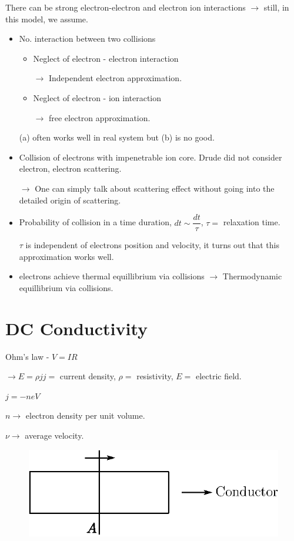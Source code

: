 There can be strong electron-electron and electron ion interactions $\to$ still, in this model, we assume.
\begin{itemize}
\item[(i)] No. interaction between two collisions
\begin{itemize}
\item[(a)] Neglect of electron - electron interaction

$\to$ Independent electron approximation.

\item[(b)] Neglect of electron - ion interaction

$\to$ free electron approximation.
\end{itemize}
(a) often works well in real system but (b) is no good.

\item[(ii)] Collision of electrons with impenetrable ion core. Drude did not consider electron, electron scattering.

$\to$ One can simply talk about scattering effect without going into the detailed origin of scattering.

\item[(iii)] Probability of collision in a time duration, $dt\sim \dfrac{dt}{\tau}$, $\tau=$ relaxation time.

$\tau$ is independent of electrons position and velocity, it turns out that this approximation works well.

\item[(iv)] electrons achieve thermal equillibrium via collisions $\to$ Thermodynamic equillibrium via collisions.
\end{itemize}

\section*{DC Conductivity}

Ohm's law - $V=IR$

$\to E=\rho j$\quad $j=$ current density, $\rho=$ resistivity, $E=$ electric field.

$j=-neV$

$n\to$ electron density per unit volume.

$\nu\to$ average velocity.
\begin{figure}[H]
\centering
\includegraphics[scale=.8]{images/lecture25/fig6.eps}
\end{figure}

